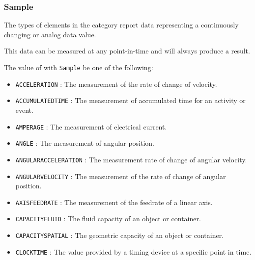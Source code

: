 \FloatBarrier

\subsubsection{Sample}
\label{sec:Sample}



The types of  elements in the  category report data representing a continuously changing or analog data value.

This data can be measured at any point-in-time and will always produce a result.


The value of  with  \texttt{Sample} \MUST be one of the following:
\begin{itemize}

\item \texttt{ACCELERATION} : The measurement of the rate of change of velocity. 

\item \texttt{ACCUMULATED\textunderscore TIME} : The measurement of accumulated time for an activity or event. 

\item \texttt{AMPERAGE} : The measurement of electrical current. 

\item \texttt{ANGLE} : The measurement of angular position. 

\item \texttt{ANGULAR\textunderscore ACCELERATION} : The measurement rate of change of angular velocity. 

\item \texttt{ANGULAR\textunderscore VELOCITY} : The measurement of the rate of change of angular position. 

\item \texttt{AXIS\textunderscore FEEDRATE} : The measurement of the feedrate of a linear axis. 

\item \texttt{CAPACITY\textunderscore FLUID} : The fluid capacity of an object or container. 

\item \texttt{CAPACITY\textunderscore SPATIAL} : The geometric capacity of an object or container. 

\item \texttt{CLOCK\textunderscore TIME} : The value provided by a timing device at a specific point in time. 


\end{itemize}
